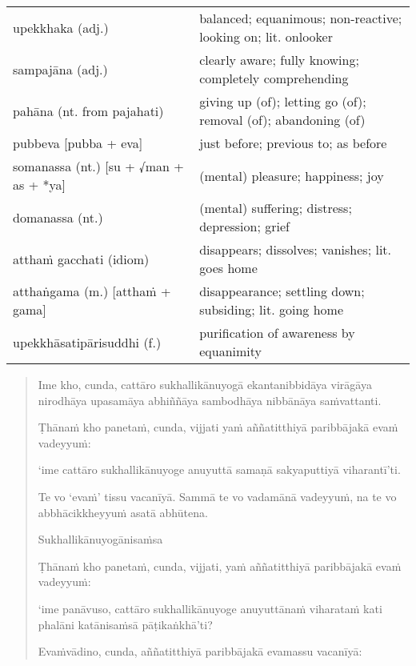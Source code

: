 \documentclass[11pt,oneside]{memoir}
\begin{document}
\vspace*{-0.5\baselineskip}

\begin{longtable}{L{\colOne} L{\colTwo}}
upekkhaka (adj.) & balanced; equanimous; non-reactive; looking on; lit. onlooker\\[0pt]
sampajāna (adj.) & clearly aware; fully knowing; completely comprehending\\[0pt]
pahāna (nt. from pajahati) & giving up (of); letting go (of); removal (of); abandoning (of)\\[0pt]
pubbeva [pubba + eva] & just before; previous to; as before\\[0pt]
somanassa (nt.) [su + √man + as + *ya] & (mental) pleasure; happiness; joy\\[0pt]
domanassa (nt.) & (mental) suffering; distress; depression; grief\\[0pt]
atthaṁ gacchati (idiom) & disappears; dissolves; vanishes; lit. goes home\\[0pt]
atthaṅgama (m.) [atthaṁ + gama] & disappearance; settling down; subsiding; lit. going home\\[0pt]
upekkhāsatipārisuddhi (f.) & purification of awareness by equanimity\\[0pt]
\end{longtable}

\vspace*{-1.5\baselineskip}

\begin{quote}
Ime kho, cunda, cattāro sukhallikānuyogā ekantanibbidāya virāgāya nirodhāya
upasamāya abhiññāya sambodhāya nibbānāya saṁvattanti.

Ṭhānaṁ kho panetaṁ, cunda, vijjati yaṁ aññatitthiyā paribbājakā evaṁ vadeyyuṁ:

‘ime cattāro sukhallikānuyoge anuyuttā samaṇā sakyaputtiyā viharantī’ti.

Te vo ‘evaṁ’ tissu vacanīyā. Sammā te vo vadamānā vadeyyuṁ, na te vo abbhācikkheyyuṁ asatā abhūtena.

Sukhallikānuyogānisaṁsa

Ṭhānaṁ kho panetaṁ, cunda, vijjati, yaṁ aññatitthiyā paribbājakā evaṁ vadeyyuṁ:

‘ime panāvuso, cattāro sukhallikānuyoge anuyuttānaṁ viharataṁ kati phalāni katānisaṁsā pāṭikaṅkhā’ti?

Evaṁvādino, cunda, aññatitthiyā paribbājakā evamassu vacanīyā:
\end{quote}

\clearpage
\end{document}
